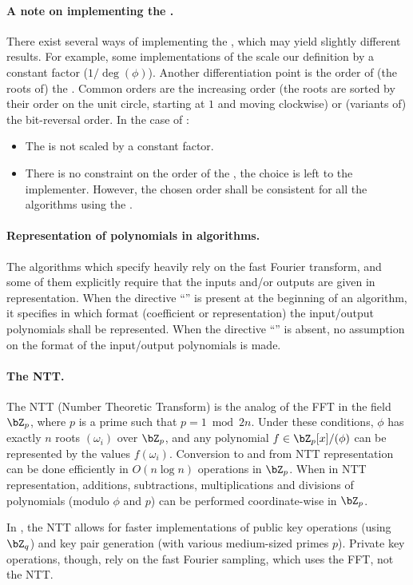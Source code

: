 \paragraph{A note on implementing the \fft.} There exist several ways of implementing the \fft, which may yield slightly different results. For example, some implementations of the \fft scale our definition by a constant factor (\eg $1/\deg(\phi)$). Another differentiation point is the order of (the roots of) the \fft. Common orders are the increasing order (\ie the roots are sorted by their order on the unit circle, starting at $1$ and moving clockwise) or (variants of) the bit-reversal order. In the case of \falcon:
\begin{itemize}
 \item The \fft is not scaled by a constant factor.
 \item There is no constraint on the order of the \fft, the choice is left to the implementer. However, the chosen order shall be consistent for all the algorithms using the \fft.
\end{itemize}


\paragraph{Representation of polynomials in algorithms.} The algorithms which specify \falcon heavily rely on the fast Fourier transform, and some of them explicitly require that the inputs and/or outputs are given in \fft representation. When the directive ``\algorithmicformat'' is present at the beginning of an algorithm, it specifies in which format (coefficient or \fft representation) the input/output polynomials shall be represented. When the directive ``\algorithmicformat'' is absent, no assumption on the format of the input/output polynomials is made.

\paragraph{The NTT.} The NTT (Number Theoretic Transform) is the analog
of the FFT in the field $\bZ_p$, where $p$ is a prime such that $p = 1
\bmod 2n$. Under these
conditions, $\phi$ has exactly $n$ roots $(\omega_i)$ over $\bZ_p$, and
any polynomial $f \in \bZ_p[x]/(\phi)$ can be represented by the values
$f(\omega_i)$. Conversion to and from NTT representation can be done
efficiently in $O(n \log n)$ operations in $\bZ_p$. When in NTT
representation, additions, subtractions, multiplications and divisions
of polynomials (modulo $\phi$ and $p$) can be performed coordinate-wise
in $\bZ_p$.

In \falcon, the NTT allows for faster
implementations of public key operations (using $\bZ_q$) and key pair
generation (with various medium-sized primes $p$). Private key
operations, though, rely on the fast Fourier sampling, which uses the
FFT, not the NTT.
